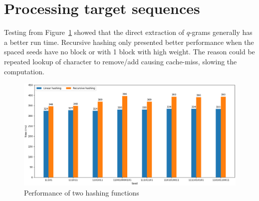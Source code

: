 \documentclass[twoside,a4paper,bsc]{master}
\newcommand{\Qgram}[1]{\(#1\)-gram}
\begin{document}
\section{Processing target sequences}
Testing from Figure~\ref{fig:target_hashing} showed that the direct
extraction of \Qgram{q}s generally has a better run time. Recursive hashing
only presented better performance when the spaced seeds have no block or
with 1 block with high weight. The reason could be repeated lookup of
character to remove/add causing cache-miss, slowing the computation.
\begin{figure}[t]
\begin{center}
\includegraphics[scale=0.45]{graphics/target_hashing.png}
\end{center}
\caption{Performance of two hashing functions}
\label{fig:target_hashing}
\end{figure}
\end{document}
